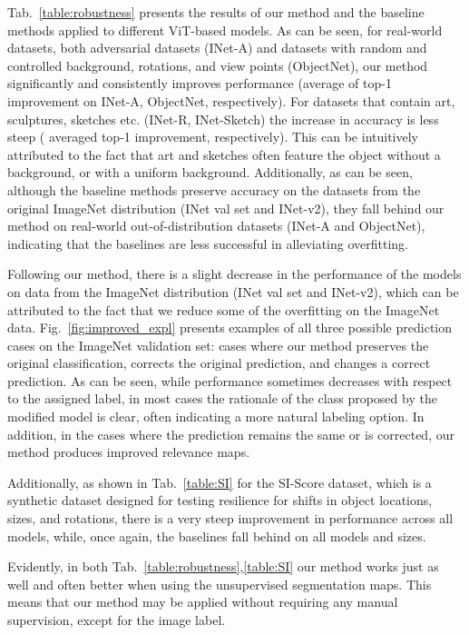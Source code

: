 \documentclass{article}
\begin{document}
 Tab.~\ref{table:robustness} presents the results of our method and the baseline methods applied to different ViT-based models. As can be seen, for real-world datasets, both adversarial datasets (INet-A) and datasets with random and controlled background, rotations, and view points (ObjectNet), our method significantly and consistently improves performance (average of  top-1 improvement on INet-A, ObjectNet, respectively). {For datasets that contain art, sculptures, sketches etc. (INet-R, INet-Sketch) the increase in accuracy is less steep ( averaged top-1 improvement, respectively). This can be intuitively attributed to the fact that art and sketches often feature the object without a background, or with a uniform background.} Additionally, as can be seen, although the baseline methods preserve accuracy on the datasets from the original ImageNet distribution (INet val set and INet-v2), they fall behind our method on real-world out-of-distribution datasets (INet-A and ObjectNet), indicating that the baselines are less successful in alleviating overfitting.

Following our method, there is a slight decrease in the performance of the models on data from the ImageNet distribution (INet val set and INet-v2), which can be attributed to the fact that we reduce some of the overfitting on the ImageNet data.  Fig.~\ref{fig:improved_expl} presents examples of all three possible prediction cases on the ImageNet validation set: cases where our method preserves the original classification, corrects the original prediction, and changes a correct prediction. As can be seen, while performance sometimes decreases with respect to the assigned label, in most cases the rationale of the class proposed by the modified model is clear, often indicating a more natural labeling option. In addition, in the cases where the prediction remains the same or is corrected, our method produces improved relevance maps.

Additionally, as shown in Tab.~\ref{table:SI} for the SI-Score dataset, which is a synthetic dataset designed for testing resilience for shifts in object locations, sizes, and rotations, there is a very steep improvement in performance across all models, while, once again, the baselines fall behind on all models and sizes.

Evidently, in both Tab.~\ref{table:robustness},\ref{table:SI} our method works just as well and often better when using the unsupervised segmentation maps. This means that our method may be applied without requiring any manual supervision, except for the image label.
\end{document}
